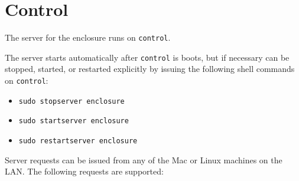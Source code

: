 \section{Control}

The server for the enclosure runs on \verb|control|. 

The server starts automatically after \verb|control| is boots, but if necessary can be stopped, started, or restarted explicitly by issuing the following shell commands on \verb|control|:
\begin{itemize}
\item
\verb|sudo stopserver enclosure|
\item
\verb|sudo startserver enclosure|
\item
\verb|sudo restartserver enclosure|
\end{itemize}

Server requests can be issued from any of the Mac or Linux machines on the LAN. The following requests are supported:

